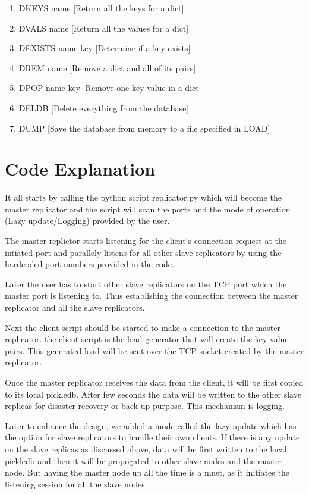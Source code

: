 \begin{enumerate}
\item  DKEYS name [Return all the keys for a dict]

\item  DVALS name [Return all the values for a dict]

\item  DEXISTS name key [Determine if a key exists]

\item  DREM name [Remove a dict and all of its pairs]

\item  DPOP name key [Remove one key-value in a dict]

\item  DELDB [Delete everything from the database]

\item  DUMP [Save the database from memory to a file specified in LOAD]

\end{enumerate}

\section{Code Explanation}
It all starts by calling the python script replicator.py which will become the master replicator and the script will scan the ports and the mode of operation (Lazy update/Logging) provided by the user. 

The master replictor starts listening for the client`s connection request at the intiated port and parallely listens for all other slave replicators by using the hardcoded port numbers provided in the code. 

Later the user has to start other slave replicators on the TCP port which the master port is listening to. Thus establishing the connection between the master replicator and all the slave replicators. 

Next the client script should be started to make a connection to the master replicator. the client script is the load generator that will create the key value pairs. This generated load will be sent over the TCP socket created by the master replicator.

Once the master replicator receives the data from the client, it will be first copied to its local pickledb.  After few seconds the data will be written to the other slave replicas for disaster recovery or back up purpose. This mechanism is logging. 

Later to enhance the design, we added a mode called the lazy update which has the option for slave replicators to handle their own clients. If there is any update on the slave replicas as discussed above, data will be first written to the local pickledb and then it will be propogated to other slave nodes and the master node. But having the master node up all the time is a must, as it initiates the listening session for all the slave nodes. 

